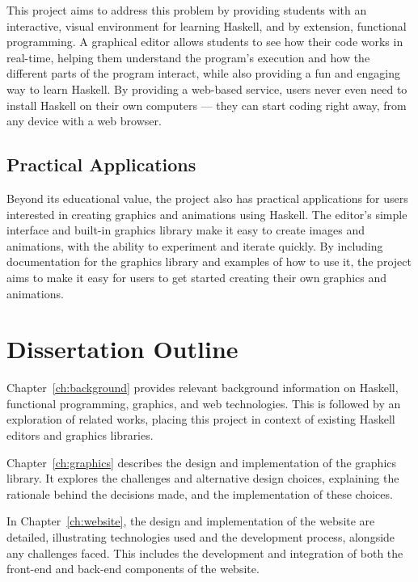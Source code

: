 \documentclass[../main.tex]{subfiles}
\begin{document}
        This project aims to address this problem by providing students with an
            interactive, visual environment for learning Haskell, and by extension,
            functional programming.
        A graphical editor allows students to see how their code works in real-time,
            helping them understand the program's execution and how the different parts of
            the program interact, while also providing a fun and engaging way to learn
            Haskell.
        By providing a web-based service, users never even need to install Haskell on
            their own computers — they can start coding right away, from any device with a
            web browser.

    \subsection{Practical Applications}
        Beyond its educational value, the project also has practical applications for
            users interested in creating graphics and animations using Haskell.
        The editor's simple interface and built-in graphics library make it easy to
            create images and animations, with the ability to experiment and iterate
            quickly.
        By including documentation for the graphics library and examples of how to use
            it, the project aims to make it easy for users to get started creating their
            own graphics and animations.

    \section{Dissertation Outline}
        Chapter~\ref{ch:background} provides relevant background information on
            Haskell, functional programming, graphics, and web technologies.
        This is followed by an exploration of related works, placing this project in
            context of existing Haskell editors and graphics libraries.

        Chapter~\ref{ch:graphics} describes the design and implementation of the
            graphics library.
        It explores the challenges and alternative design choices, explaining the
            rationale behind the decisions made, and the implementation of these choices.

        In Chapter~\ref{ch:website}, the design and implementation of the website are
            detailed, illustrating technologies used and the development process, alongside
            any challenges faced.
        This includes the development and integration of both the front-end and
            back-end components of the website.
\end{document}
